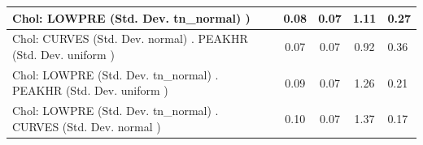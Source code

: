 \begin{table}
\begin{center}
\begin{tabular}{|l|l|c|c|c|l|}
			\hline
			 Chol: LOWPRE (Std. Dev. tn_normal) ) &  & 0.08 & 0.07 & 1.11 & 0.27 \\
			\hline
			 Chol: CURVES (Std. Dev. normal) . PEAKHR (Std. Dev.   uniform ) &  & 0.07 & 0.07 & 0.92 & 0.36 \\
			\hline
			 Chol: LOWPRE (Std. Dev. tn_normal) . PEAKHR (Std. Dev.   uniform ) &  & 0.09 & 0.07 & 1.26 & 0.21 \\
			\hline
			 Chol: LOWPRE (Std. Dev. tn_normal) . CURVES (Std. Dev.   normal ) &  & 0.10 & 0.07 & 1.37 & 0.17 \\
			\hline
		\end{tabular}
	\end{center}
\end{table}